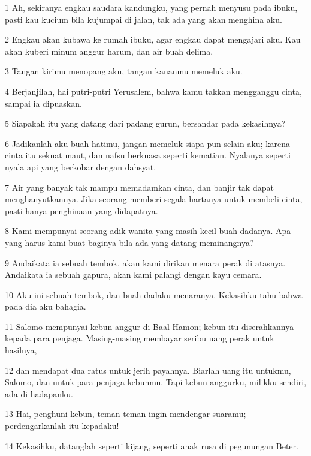 \par 1 Ah, sekiranya engkau saudara kandungku, yang pernah menyusu pada ibuku, pasti kau kucium bila kujumpai di jalan, tak ada yang akan menghina aku.
\par 2 Engkau akan kubawa ke rumah ibuku, agar engkau dapat mengajari aku. Kau akan kuberi minum anggur harum, dan air buah delima.
\par 3 Tangan kirimu menopang aku, tangan kananmu memeluk aku.
\par 4 Berjanjilah, hai putri-putri Yerusalem, bahwa kamu takkan mengganggu cinta, sampai ia dipuaskan.
\par 5 Siapakah itu yang datang dari padang gurun, bersandar pada kekasihnya?
\par 6 Jadikanlah aku buah hatimu, jangan memeluk siapa pun selain aku; karena cinta itu sekuat maut, dan nafsu berkuasa seperti kematian. Nyalanya seperti nyala api yang berkobar dengan dahsyat.
\par 7 Air yang banyak tak mampu memadamkan cinta, dan banjir tak dapat menghanyutkannya. Jika seorang memberi segala hartanya untuk membeli cinta, pasti hanya penghinaan yang didapatnya.
\par 8 Kami mempunyai seorang adik wanita yang masih kecil buah dadanya. Apa yang harus kami buat baginya bila ada yang datang meminangnya?
\par 9 Andaikata ia sebuah tembok, akan kami dirikan menara perak di atasnya. Andaikata ia sebuah gapura, akan kami palangi dengan kayu cemara.
\par 10 Aku ini sebuah tembok, dan buah dadaku menaranya. Kekasihku tahu bahwa pada dia aku bahagia.
\par 11 Salomo mempunyai kebun anggur di Baal-Hamon; kebun itu diserahkannya kepada para penjaga. Masing-masing membayar seribu uang perak untuk hasilnya,
\par 12 dan mendapat dua ratus untuk jerih payahnya. Biarlah uang itu untukmu, Salomo, dan untuk para penjaga kebunmu. Tapi kebun anggurku, milikku sendiri, ada di hadapanku.
\par 13 Hai, penghuni kebun, teman-teman ingin mendengar suaramu; perdengarkanlah itu kepadaku!
\par 14 Kekasihku, datanglah seperti kijang, seperti anak rusa di pegunungan Beter.


